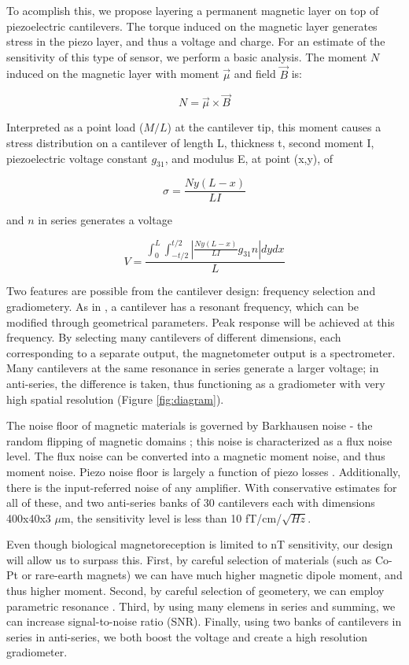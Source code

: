 To acomplish this, we propose layering a permanent magnetic layer on top of piezoelectric cantilevers. The torque induced on the magnetic layer generates stress in the piezo layer, and thus a voltage and charge. For an estimate of the sensitivity of this type of sensor, we perform a basic analysis. The moment $N$ induced on the magnetic layer with moment $\vec{\mu}$ and field $\vec{B}$ is:


$$  N=\vec{\mu} \times \vec{B} $$

Interpreted as a point load ($M/L$) at the cantilever tip, this moment causes a stress distribution on a cantilever of length L, thickness t, second moment I, piezoelectric voltage constant $g_{31}$, and modulus E, at point (x,y), of

$$ \sigma=\frac{Ny(L-x)}{LI} $$

and $n$ in series generates a voltage

$$ V=\frac{\int_0^L\int_{-t/2}^{t/2}\left|\frac{Ny(L-x)}{LI}g_{31}n\right|dydx}{L} $$

Two features are possible from the cantilever design: frequency selection and gradiometery. As in \cite{shen2008design}, a cantilever has a resonant frequency, which can be modified through geometrical parameters. Peak response will be achieved at this frequency. By selecting many cantilevers of different dimensions, each corresponding to a separate output, the magnetometer output is a spectrometer. Many cantilevers at the same resonance in series generate a larger voltage; in anti-series, the difference is taken, thus functioning as a gradiometer with very high spatial resolution (Figure \ref{fig:diagram}).

The noise floor of magnetic materials is governed by Barkhausen noise - the random flipping of magnetic domains \cite{butta2012sources}; this noise is characterized as a flux noise level. The flux noise can be converted into a magnetic moment noise, and thus moment noise. Piezo noise floor is largely a function of piezo losses \cite{levinzon2004fundamental}. Additionally, there is the input-referred noise of any amplifier. With conservative estimates for all of these, and two anti-series banks of 30 cantilevers each with dimensions 400x40x3 $\mu$m, the sensitivity level is less than 10 fT/cm/$\sqrt{Hz}$.

 Even though biological magnetoreception is limited to nT sensitivity, our design will allow us to surpass this. First, by careful selection of materials (such as Co-Pt or rare-earth magnets) \cite{coey2010magnetism, arnold2009permanent} we can have much higher magnetic dipole moment, and thus higher moment. Second, by careful selection of geometery, we can employ parametric resonance \cite{van2006resonant}. Third, by using many elemens in series and summing, we can increase signal-to-noise ratio (SNR). Finally, using two banks of cantilevers in series in anti-series, we both boost the voltage and create a high resolution gradiometer.

